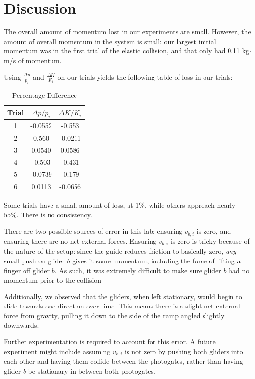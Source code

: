 \documentclass[12pt]{article}
\begin{document}
\section{Discussion}
\label{sec:org52fb8de}

The overall amount of momentum lost in our experiments are small. However, the amount of overall momentum in the system is small: our largest initial momentum was in the first trial of the elastic collision, and that only had 0.11 kg\(\cdot\)m/s of momentum.

Using \(\frac{\Delta p}{p_i}\) and \(\frac{\Delta K}{K_i}\) on our trials yields the following table of loss in our trials:

\begin{table}[htbp]
\caption{\label{fig:diff}Percentage Difference}
\centering
\begin{tabular}{c|c|c}
Trial & \(\Delta p/p_i\) & \(\Delta K/K_i\)\\
\hline
1 & -0.0552 & -0.553\\
2 & 0.560 & -0.0211\\
3 & 0.0540 & 0.0586\\
4 & -0.503 & -0.431\\
5 & -0.0739 & -0.179\\
6 & 0.0113 & -0.0656\\
\end{tabular}
\end{table}

Some trials have a small amount of loss, at 1\%, while others approach nearly 55\%. There is no consistency.

There are two possible sources of error in this lab: ensuring \(v_{b,i}\) is zero, and ensuring there are no net external forces. Ensuring \(v_{b,i}\) is zero is tricky because of the nature of the setup: since the guide reduces friction to basically zero, \emph{any} small push on glider \(b\) gives it some momentum, including the force of lifting a finger off glider \(b\). As such, it was extremely difficult to make sure glider \(b\) had no momentum prior to the collision.

Additionally, we observed that the gliders, when left stationary, would begin to slide towards one direction over time. This means there is a slight net external force from gravity, pulling it down to the side of the ramp angled slightly downwards.

Further experimentation is required to account for this error. A future experiment might include assuming \(v_{b,i}\) is not zero by pushing both gliders into each other and having them collide between the photogates, rather than having glider \(b\) be stationary in between both photogates.
\end{document}
